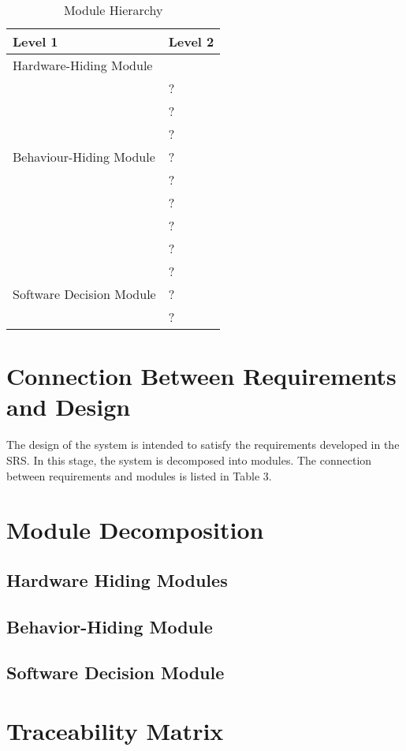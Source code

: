 \documentclass[12pt,letterpaper]{article}
\begin{document}
\begin{table}[h!]
\centering
\begin{tabular}{p{} p{}}
\toprule
\textbf{Level 1} & \textbf{Level 2}\\
\midrule
{Hardware-Hiding Module} & ~ \\
\midrule
\multirow{7}{0.3\textwidth}{Behaviour-Hiding Module} & ?\\
& ?\\
& ?\\
& ?\\
& ?\\
& ?\\
& ?\\ 
& ?\\
\midrule
\multirow{3}{0.3\textwidth}{Software Decision Module} & {?}\\
& ?\\
& ?\\
\bottomrule
\end{tabular}
\caption{Module Hierarchy}
\label{TblMH}
\end{table}

	\section{Connection Between Requirements and Design}
	The design of the system is intended to satisfy the requirements developed in the SRS. In this stage, the system is decomposed into modules. The connection between requirements and modules is listed in Table 3.

	\section{Module Decomposition}
	\subsection{Hardware Hiding Modules}

	\subsection{Behavior-Hiding Module}

	\subsection{Software Decision Module}

	\section{Traceability Matrix}
\end{document}
